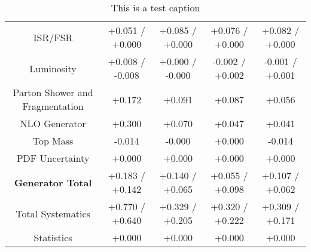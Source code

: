 \begin{table}[htbp]
\begin{center}
\begin{tabular}{|c|c|c|c|c|}
ISR/FSR                               &+0.051   / +0.000   & +0.085   / +0.000   & +0.076   / +0.000   & +0.082   / +0.000  \\
Luminosity                            &+0.008   / -0.008   & +0.000   / -0.000   & -0.002   / +0.002   & -0.001   / +0.001  \\
Parton Shower and Fragmentation       &+0.172              & +0.091              & +0.087              & +0.056             \\
NLO Generator                         &+0.300              & +0.070              & +0.047              & +0.041             \\
Top Mass                              &-0.014              & -0.000              & +0.000              & -0.014             \\
PDF Uncertainty                       &+0.000              & +0.000              & +0.000              & +0.000             \\
\hline
\textbf{Generator Total}              &+0.183   / +0.142   & +0.140   / +0.065   & +0.055   / +0.098   & +0.107   / +0.062  \\
\hline
\hline
Total Systematics                     &+0.770   / +0.640   & +0.329   / +0.205   & +0.320   / +0.222   & +0.309   / +0.171  \\
Statistics                            &+0.000              & +0.000              & +0.000              & +0.000             \\
\hline
  \end{tabular}
  \end{center} 
  \label{tab:fsm_nominal_deltaPhi_low}
  \caption{This is a test caption}
\end{table}



